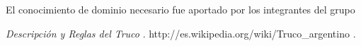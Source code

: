 \documentclass[12pt,a4paper]{article}
\begin{document}
El conocimiento de dominio necesario fue aportado por los integrantes del grupo 


\begin{thebibliography}{9}

	 \emph{Descripci\'on y Reglas del Truco }. 
	http://es.wikipedia.org/wiki/Truco\_argentino .

\end{thebibliography}
\end{document}
